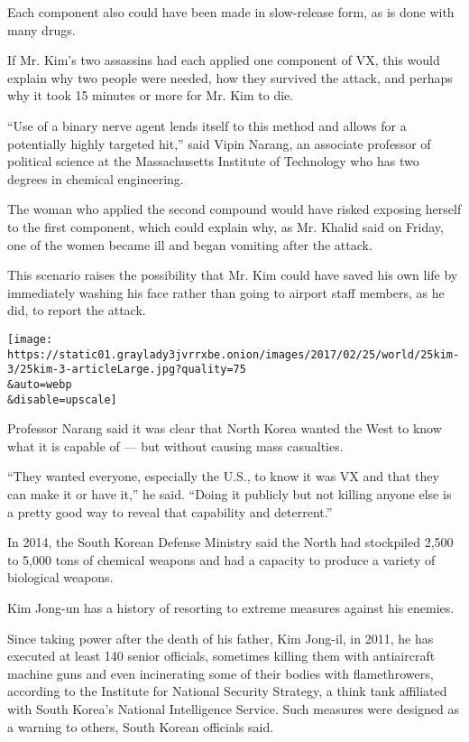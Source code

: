 Each component also could have been made in slow-release form, as is
done with many drugs.

If Mr. Kim's two assassins had each applied one component of VX, this
would explain why two people were needed, how they survived the attack,
and perhaps why it took 15 minutes or more for Mr. Kim to die.

``Use of a binary nerve agent lends itself to this method and allows for
a potentially highly targeted hit,'' said Vipin Narang, an associate
professor of political science at the Massachusetts Institute of
Technology who has two degrees in chemical engineering.

The woman who applied the second compound would have risked exposing
herself to the first component, which could explain why, as Mr. Khalid
said on Friday, one of the women became ill and began vomiting after the
attack.

This scenario raises the possibility that Mr. Kim could have saved his
own life by immediately washing his face rather than going to airport
staff members, as he did, to report the attack.

\texttt{[image: https://static01.graylady3jvrrxbe.onion/images/2017/02/25/world/25kim-3/25kim-3-articleLarge.jpg?quality=75\\\&auto=webp\\\&disable=upscale]}

Professor Narang said it was clear that North Korea wanted the West to
know what it is capable of --- but without causing mass casualties.

``They wanted everyone, especially the U.S., to know it was VX and that
they can make it or have it,'' he said. ``Doing it publicly but not
killing anyone else is a pretty good way to reveal that capability and
deterrent.''

In 2014, the South Korean Defense Ministry said the North had stockpiled
2,500 to 5,000 tons of chemical weapons and had a capacity to produce a
variety of biological weapons.

Kim Jong-un has a history of resorting to extreme measures against his
enemies.

Since taking power after the death of his father, Kim Jong-il, in 2011,
he has executed at least 140 senior officials, sometimes killing them
with antiaircraft machine guns and even incinerating some of their
bodies with flamethrowers, according to the Institute for National
Security Strategy, a think tank affiliated with South Korea's National
Intelligence Service. Such measures were designed as a warning to
others, South Korean officials said.

